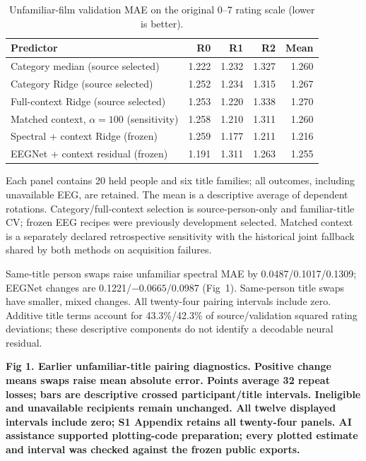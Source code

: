 \documentclass[10pt,letterpaper]{article}
\begin{document}
\begin{table}[!htbp]
\centering
\small
\caption{Unfamiliar-film validation MAE on the original 0--7 rating scale (lower is better).}
\label{tab:primary}
\begin{tabular}{lrrrr}
\toprule
Predictor & R0 & R1 & R2 & Mean \\
\midrule
Category median (source selected) & 1.222 & 1.232 & 1.327 & 1.260 \\
Category Ridge (source selected) & 1.252 & 1.234 & 1.315 & 1.267 \\
Full-context Ridge (source selected) & 1.253 & 1.220 & 1.338 & 1.270 \\
Matched context, $\alpha=100$ (sensitivity) & 1.258 & 1.210 & 1.311 & 1.260 \\
Spectral + context Ridge (frozen) & 1.259 & 1.177 & 1.211 & 1.216 \\
EEGNet + context residual (frozen) & 1.191 & 1.311 & 1.263 & 1.255 \\
\bottomrule
\end{tabular}
\par\medskip\begin{minipage}{0.97\linewidth}\footnotesize Each panel contains 20 held people and six title families; all outcomes, including unavailable EEG, are retained. The mean is a descriptive average of dependent rotations. Category/full-context selection is source-person-only and familiar-title CV; frozen EEG recipes were previously development selected. Matched context is a separately declared retrospective sensitivity with the historical joint fallback shared by both methods on acquisition failures.\end{minipage}
\end{table}





Same-title person swaps raise unfamiliar spectral MAE by 0.0487/0.1017/0.1309; EEGNet changes are 0.1221/\(-0.0665\)/0.0987 (Fig~1). Same-person title swaps have smaller, mixed changes. All twenty-four pairing intervals include zero. Additive title terms account for 43.3\%/42.3\% of source/validation squared rating deviations; these descriptive components do not identify a decodable neural residual.

\par\medskip\begin{samepage}\noindent
\textbf{Fig 1. Earlier unfamiliar-title pairing diagnostics. Positive change means swaps raise mean absolute error. Points average 32 repeat losses; bars are descriptive crossed participant/title intervals. Ineligible and unavailable recipients remain unchanged. All twelve displayed intervals include zero; S1 Appendix retains all twenty-four panels. AI assistance supported plotting-code preparation; every plotted estimate and interval was checked against the frozen public exports.}\label{fig:pairing}
\par\end{samepage}\medskip
\end{document}
